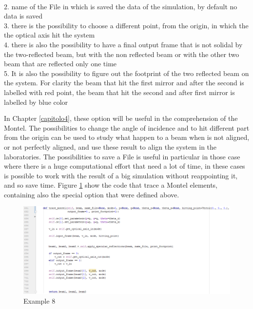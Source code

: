 	\\ \hspace{20mm} 2. name of the File in which is saved the data of the simulation, by default no data is saved
	\\ \hspace{20mm} 3. there is the possibility to choose a different point, from the origin, in which the the optical axis hit the system
	\\ \hspace{20mm} 4. there is also the possibility to have a final output frame that is not solidal by the two-reflected beam, but with the non reflected beam or with the other two beam that are reflected only one time
	\\ \hspace{20mm} 5. It is also the possibility to figure out the footprint of the two reflected beam on the system. For clarity the beam that hit the first mirror and after the second is labelled with red point, the beam that hit the second and after first mirror is labelled by blue color

\noindent In Chapter \ref{capitolo4}, these option will be useful in the comprehension of the Montel. The possibilities to change the angle of incidence and to hit different part from the origin can be used to study what happen to a beam when is not aligned, or not perfectly aligned, and use these result to align the system in the laboratories. The possibilities to save a File is useful in particular in those case where there is a huge computational effort that need a lot of time, in these cases is possible to work with the result of a big simulation without reappointing it, and so save time. Figure \ref{fig: CodeTraceMontel} show the code that trace a Montel elements, containing also the special option that were defined above.
\begin{figure}[H]
%
\centering
%
\includegraphics[width=.65\textwidth]{Immagini/Chapter3/CodeTraceMontel}
%
\caption{Example 8}
%
\label{fig: CodeTraceMontel}
%
\end{figure}